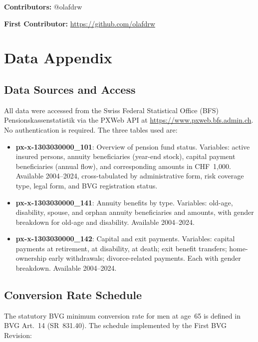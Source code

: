 \documentclass[12pt]{article}
\begin{document}
\noindent\textbf{Contributors:} @olafdrw

\noindent\textbf{First Contributor:} \url{https://github.com/olafdrw}

\label{apep_main_text_end}
\newpage


\newpage
\appendix

\section{Data Appendix}
\label{app:data}

\subsection{Data Sources and Access}

All data were accessed from the Swiss Federal Statistical Office (BFS) Pensionskassenstatistik via the PXWeb API at \url{https://www.pxweb.bfs.admin.ch}. No authentication is required. The three tables used are:

\begin{itemize}
\item \textbf{px-x-1303030000\_101}: Overview of pension fund status. Variables: active insured persons, annuity beneficiaries (year-end stock), capital payment beneficiaries (annual flow), and corresponding amounts in CHF~1,000. Available 2004--2024, cross-tabulated by administrative form, risk coverage type, legal form, and BVG registration status.
\item \textbf{px-x-1303030000\_141}: Annuity benefits by type. Variables: old-age, disability, spouse, and orphan annuity beneficiaries and amounts, with gender breakdown for old-age and disability. Available 2004--2024.
\item \textbf{px-x-1303030000\_142}: Capital and exit payments. Variables: capital payments at retirement, at disability, at death; exit benefit transfers; home-ownership early withdrawals; divorce-related payments. Each with gender breakdown. Available 2004--2024.
\end{itemize}

\subsection{Conversion Rate Schedule}

The statutory BVG minimum conversion rate for men at age~65 is defined in BVG Art.~14 (SR~831.40). The schedule implemented by the First BVG Revision:
\end{document}
